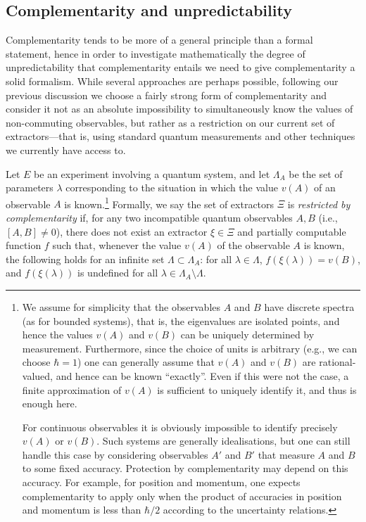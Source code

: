 \documentclass[information,article,submit,moreauthors,pdftex,12pt,a4paper]{mdpi}
\theoremstyle{mdpi}
\newcounter{ex}
\newcounter{re}
\theoremstyle{mdpidefinition}
\begin{document}
\subsection{Complementarity and unpredictability}\label{sec:quantumComplUnpred}


Complementarity tends to be more of a general principle than a formal statement, hence in order to investigate mathematically the degree of unpredictability that complementarity entails we need to give complementarity a solid formalism.
While several approaches are perhaps possible, following our previous discussion we choose a fairly strong form of complementarity and consider it not as an absolute impossibility to simultaneously know the values of non-commuting observables, but rather as a restriction on our current set of extractors---that is, using standard quantum measurements and other techniques we currently have access to.

Let $E$ be an experiment involving a quantum system, and let $\Lambda_A$ be the set of parameters $\lambda$ corresponding to the situation in which the value $v(A)$ of an observable $A$ is known.\footnote{We assume for simplicity that the observables $A$ and $B$ have discrete spectra (as for bounded systems), that is, the eigenvalues are isolated points, and hence the values $v(A)$ and $v(B)$ can be uniquely determined by measurement.
	Furthermore, since the choice of units is arbitrary (e.g., we can choose $\hbar=1$) one can generally assume that $v(A)$ and $v(B)$ are rational-valued, and hence can be known ``exactly''.
	Even if this were not the case, a finite approximation of $v(A)$ is sufficient to uniquely identify it, and thus is enough here.

	For continuous observables it is obviously impossible to identify precisely $v(A)$ or $v(B)$.
	Such systems are generally idealisations, but one can still handle this case by considering observables $A'$ and $B'$ that measure $A$ and $B$ to some fixed accuracy.
	Protection by complementarity may depend on this accuracy. For example, for position and momentum, one expects complementarity to apply only when the product of accuracies in position and momentum is less than $\hbar/2$ according to the uncertainty relations.}
Formally, we say the set of extractors $\Xi$ is \emph{restricted by complementarity} if, for any two incompatible quantum observables $A,B$ (i.e., $[A,B]\neq 0$), there does not exist an extractor $\xi\in\Xi$ and partially computable function $f$ such that, whenever the value $v(A)$ of the observable $A$ is known, the following holds for an infinite set $\Lambda\subset \Lambda_A$: for all $\lambda \in \Lambda$, $f(\xi(\lambda))=v(B)$, and $f(\xi(\lambda))$ is undefined for all $\lambda \in \Lambda_A \setminus \Lambda$.
\end{document}
